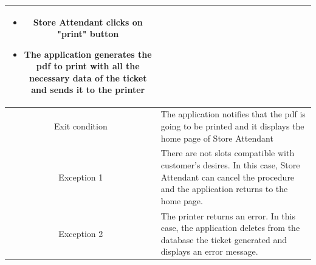 \documentclass[table, 12pt]{article}
\begin{document}
\begin{minipage}{\textwidth}
\begin{longtable}{|c| p{10cm}|}
\begin{itemize}[nosep,after=\strut]
            \item Store Attendant clicks on "print" button
            \item The application generates the pdf to print with all the necessary data of the ticket and sends it to the printer
        \end{itemize}                                                                                                                                   \\
        \hline
        Exit condition   & The application notifies that the pdf is going to be printed and it displays the home page of Store Attendant
        \\
        \hline
        \hline
        Exception 1      & There are not slots compatible with customer's desires. In this case, Store Attendant can cancel the procedure and the application returns to the home page. \\
        \hline
        Exception 2      & The printer returns an error. In this case, the application deletes from the database the ticket generated and displays an error message.                    \\
        \hline
    \end{longtable}

\end{minipage}
\end{document}

